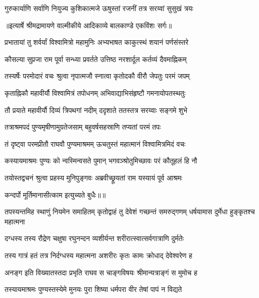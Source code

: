 \twolineshloka
{गुरुकार्याणि सर्वाणि नियुज्य कुशिकात्मजे}
{ऊषुस्तां रजनीं तत्र सरय्वां सुसुखं त्रयः} %


{॥इत्यार्षे श्रीमद्रामायणे वाल्मीकीये आदिकाव्ये बालकाण्डे एकविंशः सर्गः॥}


\twolineshloka
{प्रभातायां तु शर्वर्यां विश्वामित्रो महामुनिः}
{अभ्यभाषत काकुत्स्थं शयानं पर्णसंस्तरे} %

\twolineshloka
{कौसल्या सुप्रजा राम पूर्वा सन्ध्या प्रवर्तते}
{उत्तिष्ठ नरशार्दूल कर्तव्यं दैवमाह्निकम्} %

\twolineshloka
{तस्यर्षेः परमोदारं वचः श्रुत्वा नृपात्मजौ}
{स्नात्वा कृतोदकौ वीरौ जेपतुः परमं जपम्} %

\twolineshloka
{कृताह्निकौ महावीर्यौ विश्वामित्रं तपोधनम्}
{अभिवाद्याभिसंहृष्टौ गमनायोपतस्थतुः} %

\twolineshloka
{तौ प्रयाते महावीर्यौ दिव्यं त्रिपथगां नदीम्}
{ददृशाते ततस्तत्र सरय्वाः सङ्गमे शुभे} %

\twolineshloka
{तत्राश्रमपदं पुण्यमृषीणामुग्रतेजसाम्}
{बहुवर्षसहस्राणि तप्यतां परमं तपः} %

\twolineshloka
{तं दृष्ट्वा परमप्रीतौ राघवौ पुण्यमाश्रमम्}
{ऊचतुस्तं महात्मानं विश्वामित्रमिदं वचः} %

\twolineshloka
{कस्यायमाश्रमः पुण्यः को न्वस्मिन्वसते पुमान्}
{भगवञ्श्रोतुमिच्छावः परं कौतूहलं हि नौ} %

\twolineshloka
{तयोस्तद्वचनं श्रुत्वा प्रहस्य मुनिपुङ्गवः}
{अब्रवीच्छ्रूयतां राम यस्यायं पूर्व आश्रमः} %

{कन्दर्पो मूर्तिमानासीत्काम इत्युच्यते बुधैः॥॥} %

\addtocounter{shlokacount}{1}

\threelineshloka
{तपस्यन्तमिह स्थाणुं नियमेन समाहितम्}
{कृतोद्वाहं तु देवेशं गच्छन्तं समरुद्गणम्}
{धर्षयामास दुर्मेधा हुङ्कृतश्च महात्मना} %

\twolineshloka
{दग्धस्य तस्य रौद्रेण चक्षुषा रघुनन्दन}
{व्यशीर्यन्त शरीरात्स्वात्सर्वगात्राणि दुर्मतेः} %

\twolineshloka
{तस्य गात्रं हतं तत्र निर्दग्धस्य महात्मना}
{अशरीरः कृतः कामः क्रोधाद् देवेश्वरेण ह} %

\twolineshloka
{अनङ्ग इति विख्यातस्तदा प्रभृति राघव}
{स चाङ्गविषयः श्रीमान्यत्राङ्गं स मुमोच ह} %

\twolineshloka
{तस्यायमाश्रमः पुण्यस्तस्येमे मुनयः पुरा}
{शिष्या धर्मपरा वीर तेषां पापं न विद्यते} %


